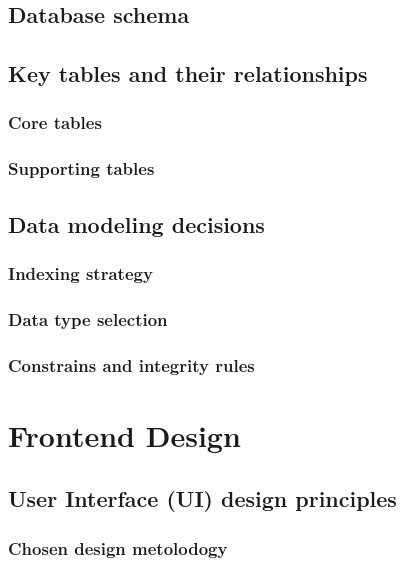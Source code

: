 \subsection{Database schema}

\subsection{Key tables and their relationships}

\subsubsection{Core tables}
    
\subsubsection{Supporting tables}
    
\subsection{Data modeling decisions}

\subsubsection{Indexing strategy}

\subsubsection{Data type selection}

\subsubsection{Constrains and integrity rules}

\section{Frontend Design}

\subsection{User Interface (UI) design principles}

\subsubsection{Chosen design metolodogy}

